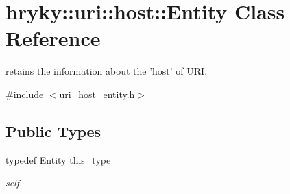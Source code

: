 \hypertarget{classhryky_1_1uri_1_1host_1_1_entity}{\section{hryky\-:\-:uri\-:\-:host\-:\-:Entity Class Reference}
\label{classhryky_1_1uri_1_1host_1_1_entity}
}


retains the information about the 'host' of U\-R\-I.  




{\ttfamily \#include $<$uri\-\_\-host\-\_\-entity.\-h$>$}

\subsection*{Public Types}
\begin{DoxyCompactItemize}
\item 
\hypertarget{classhryky_1_1uri_1_1host_1_1_entity_ac8c50881bac165d457a3aa36480b5158}{typedef \hyperlink{classhryky_1_1uri_1_1host_1_1_entity}{Entity} \hyperlink{classhryky_1_1uri_1_1host_1_1_entity_ac8c50881bac165d457a3aa36480b5158}{this\-\_\-type}}\label{classhryky_1_1uri_1_1host_1_1_entity_ac8c50881bac165d457a3aa36480b5158}

\begin{DoxyCompactList}\small\item\em self. \end{DoxyCompactList}\end{DoxyCompactItemize}
